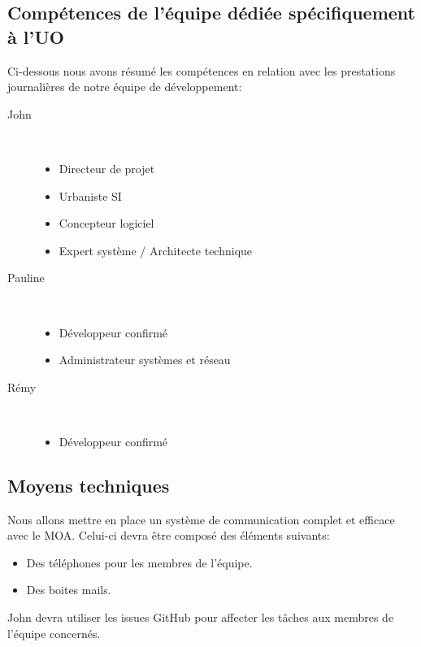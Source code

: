 		\subsection{Compétences de l'équipe dédiée spécifiquement à l'UO}	
		Ci-dessous nous avons résumé les compétences en relation avec les prestations journalières de notre équipe de développement:
		\begin{description}
			\item[John ]~
			\begin{itemize}
				\item Directeur de projet
				\item Urbaniste SI
				\item Concepteur logiciel
				\item Expert système / Architecte technique				
			\end{itemize}
			\item[Pauline ]~
				\begin{itemize}
					\item Développeur confirmé
					\item Administrateur systèmes et réseau
				\end{itemize}
			\item[Rémy ]~
				\begin{itemize}
					\item Développeur confirmé
				\end{itemize}
		\end{description}
		
		\subsection{Moyens techniques}
		Nous allons mettre en place un système de communication complet et efficace avec le MOA. Celui-ci devra être composé des éléments suivants:
		
		\begin{itemize}
			\item Des téléphones pour les membres de l’équipe.
			\item Des boites mails.
		\end{itemize}

		John  devra utiliser les issues GitHub pour affecter les tâches aux membres de l’équipe concernés. 
		
		
